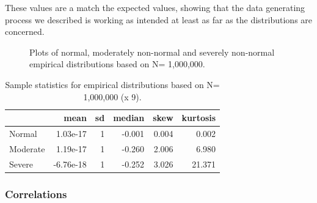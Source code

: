 \documentclass[
  letterpaper,
  DIV=11,
  numbers=noendperiod]{scrartcl}
\begin{document}
These values are a match the expected values, showing that the data
generating process we described is working as intended at least as far
as the distributions are concerned.

\begin{figure}[H]


\caption{\label{fig-dist_plot}Plots of normal, moderately non-normal and
severely non-normal empirical distributions based on N= 1,000,000.}

\end{figure}%

\begin{longtable}[]{@{}lrrrrr@{}}

\caption{\label{tbl-skew_stats}Sample statistics for empirical
distributions based on N= 1,000,000 (x 9).}

\tabularnewline

\toprule\noalign{}
& mean & sd & median & skew & kurtosis \\
\midrule\noalign{}
\endhead
\bottomrule\noalign{}
\endlastfoot
Normal & 1.03e-17 & 1 & -0.001 & 0.004 & 0.002 \\
Moderate & 1.19e-17 & 1 & -0.260 & 2.006 & 6.980 \\
Severe & -6.76e-18 & 1 & -0.252 & 3.026 & 21.371 \\

\end{longtable}

\subsubsection{Correlations}\label{correlations}
\end{document}
